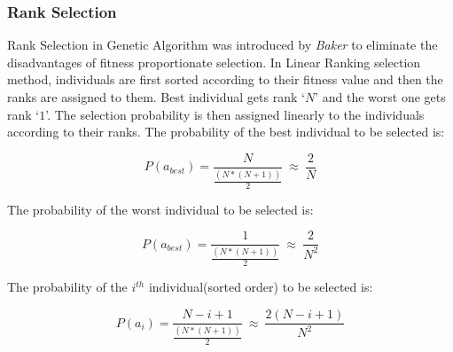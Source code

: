 \documentclass[a4paper, 12pt]{article}
\begin{document}
\subsubsection{Rank Selection}
Rank Selection in Genetic Algorithm was introduced by \textit{Baker} to eliminate the disadvantages of fitness proportionate selection. In Linear 
Ranking selection method, individuals are first sorted according to their fitness value and then the ranks are assigned to them. Best 
individual gets rank ‘$N$’ and the worst one gets rank ‘$1$’. The selection probability is then assigned linearly to the individuals according to 
their ranks.
The probability of the best individual to be selected is:
\begin{large}
\boldmath\begin{equation*}
P\left(a_{best}\right) = \frac{N}{\frac{\left(N*\left(N+1\right)\right)}{2}}\ \approx\ \frac{2}{N}
\end{equation*}
\end{large}
The probability of the worst individual to be selected is:
\begin{large}
\boldmath\begin{equation*}
P\left(a_{best}\right) = \frac{1}{\frac{\left(N*\left(N+1\right)\right)}{2}}\ \approx\ \frac{2}{N^2}
\end{equation*}
\end{large}
The probability of the $i^{th}$ individual(sorted order) to be selected is:
\begin{large}
\boldmath\begin{equation*}
P\left(a_i\right) = \frac{N-i+1}{\frac{\left(N*\left(N+1\right)\right)}{2}}\ \approx\ \frac{2\left(N-i+1\right)}{N^2}
\end{equation*}
\end{large}
\end{document}

